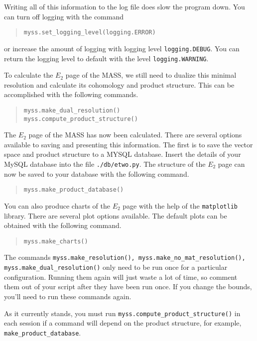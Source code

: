 \documentclass{article}
\begin{document}
Writing all of this information to the log file does slow the program
down. You can turn off logging with the command
\begin{quote}
  \texttt{myss.set\_logging\_level(logging.ERROR)}
\end{quote}
or increase the amount of logging with logging level
\texttt{logging.DEBUG}. You can return the logging level to default
with the level \texttt{logging.WARNING}.

To calculate the $E_2$ page of the MASS, we still need to dualize this
minimal resolution and calculate its cohomology and product structure.
This can be accomplished with the following commands.
\begin{quote}
\begin{verbatim}
myss.make_dual_resolution()
myss.compute_product_structure()
\end{verbatim}
\end{quote}
The $E_2$ page of the MASS has now been calculated. There are several
options available to saving and presenting this information. The first
is to save the vector space and product structure to a MYSQL
database. Insert the details of your MySQL database into the file
\texttt{./db/etwo.py}. The structure of the $E_2$ page can now be
saved to your database with the following command.
\begin{quote}
\begin{verbatim}
myss.make_product_database()
\end{verbatim}
\end{quote}

You can also produce charts of the $E_2$ page with the help of the
\texttt{matplotlib} library. There are several plot options available.
The default plots can be obtained with the following command.
\begin{quote}
\begin{verbatim}
myss.make_charts()
\end{verbatim}
\end{quote}

The commands \texttt{myss.make\_resolution(),
  myss.make\_no\_mat\_resolution(), myss.make\_dual\_resolution()}
only need to be run once for a particular configuration. Running them
again will just waste a lot of time, so comment them out of your
script after they have been run once. If you change the bounds, you'll
need to run these commands again.

As it currently stands, you must run
\texttt{myss.compute\_product\_structure()} in each session if a
command will depend on the product structure, for example,
\texttt{make\_product\_database}.
\end{document}
